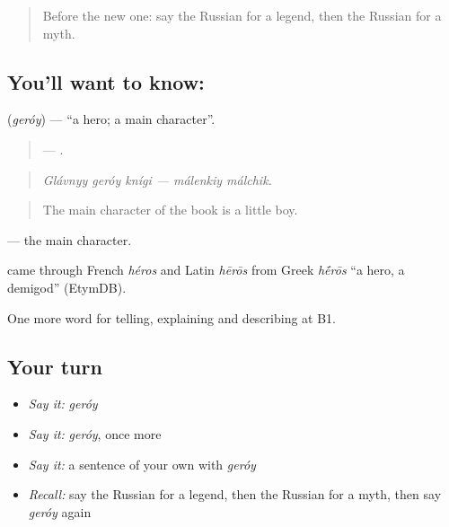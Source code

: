 \begin{quote}
Before the new one: say the Russian for a legend, then the Russian for a myth.
\end{quote}

\subsection*{You'll want to know: }
\textbf{} (\emph{geróy}) — \textquotedblleft{}a hero; a main character\textquotedblright{}.

\begin{quote}
   —  .
\end{quote}

\begin{quote}
\emph{Glávnyy geróy knígi — málenkiy málchik.}
\end{quote}

\begin{quote}
The main character of the book is a little boy.
\end{quote}

\emph{ } — the main character.

\begin{cousinweb}
\emph{} came through French \emph{héros} and Latin \emph{hērōs} from Greek \emph{h\'{\={e}}rōs} \textquotedblleft{}a hero, a demigod\textquotedblright{} (EtymDB).
\end{cousinweb}

\begin{grammarlens}[title={What you've built}]
One more word for telling, explaining and describing at B1.
\end{grammarlens}

\subsection*{Your turn}
\begin{itemize}
\raggedright
  \item \emph{Say it:} \emph{geróy}
  \item \emph{Say it:} \emph{geróy}, once more
  \item \emph{Say it:} a sentence of your own with \emph{geróy}
  \item \emph{Recall:} say the Russian for a legend, then the Russian for a myth, then say \emph{geróy} again
\end{itemize}

